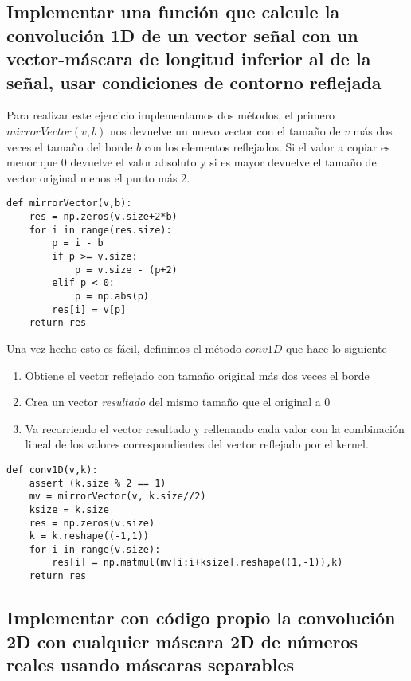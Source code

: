\documentclass{article}
\begin{document}
\subsection{Implementar una función que calcule la convolución 1D de un vector señal con un vector-máscara de longitud inferior al de la señal, usar condiciones de contorno reflejada}

Para realizar este ejercicio implementamos dos métodos, el primero $mirrorVector(v,b)$ nos devuelve un nuevo vector con el tamaño de $v$ más dos veces el tamaño del borde $b$ con los elementos reflejados. Si el valor a copiar es menor que 0 devuelve el valor absoluto y si es mayor devuelve el tamaño del vector original menos el punto más 2.

\begin{lstlisting}
def mirrorVector(v,b):
    res = np.zeros(v.size+2*b)
    for i in range(res.size):
        p = i - b
        if p >= v.size:
            p = v.size - (p+2)
        elif p < 0:
            p = np.abs(p)
        res[i] = v[p]
    return res
\end{lstlisting}

Una vez hecho esto es fácil, definimos el método $conv1D$ que hace lo siguiente

\begin{enumerate}
\item Obtiene el vector reflejado con tamaño original más dos veces el borde
\item Crea un vector \textit{resultado} del mismo tamaño que el original a 0
\item Va recorriendo el vector resultado y rellenando cada valor con la combinación lineal de los valores correspondientes del vector reflejado por el kernel.
\end{enumerate}

\begin{lstlisting}
def conv1D(v,k):
    assert (k.size % 2 == 1)
    mv = mirrorVector(v, k.size//2)
    ksize = k.size
    res = np.zeros(v.size)
    k = k.reshape((-1,1))
    for i in range(v.size):
        res[i] = np.matmul(mv[i:i+ksize].reshape((1,-1)),k)
    return res
\end{lstlisting}

\subsection{Implementar con código propio la convolución 2D con cualquier máscara 2D de números reales usando máscaras separables}
\end{document}
